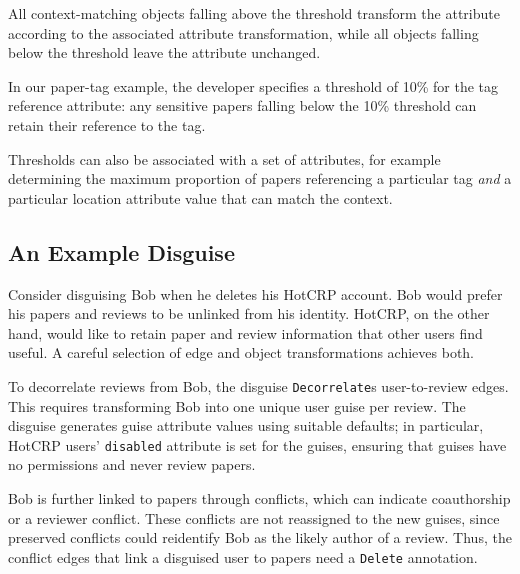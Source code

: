 All context-matching objects falling above the threshold transform the attribute according to the
associated attribute transformation, while all objects falling below the threshold leave the
attribute unchanged. 

In our paper-tag example, the developer specifies a threshold of 10\% for the tag reference
attribute: any sensitive papers falling below the 10\% threshold can retain their reference to the tag.

Thresholds can also be associated with a set of
attributes, for example determining the maximum proportion of papers referencing a particular tag
\emph{and} a particular location attribute value that can match the context.



\iffalse
\subsection{An Example Disguise}
\label{design:eg}
%
Consider disguising Bob when he deletes his HotCRP account.
%
Bob would prefer his papers and reviews to be unlinked from his identity.
%
HotCRP, on the other hand, would like to retain paper and review information that other users
find useful.
%
A careful selection of edge and object transformations achieves both.
%

%
To decorrelate reviews from Bob, the disguise \texttt{Decorrelate}s user-to-review edges.
%
This requires transforming Bob into one unique user guise per review.
%
The disguise generates guise attribute values using suitable defaults;
%
in particular, HotCRP users' \texttt{disabled} attribute is set for the guises,
ensuring that guises have no permissions and never review papers.
%

%
Bob is further linked to papers through conflicts, which can indicate coauthorship or a
reviewer conflict.
%
These conflicts are not reassigned to the new guises, since preserved
conflicts could reidentify Bob as the likely author of a review. Thus, the
conflict edges that link a disguised user to papers need a \texttt{Delete} annotation.
%


